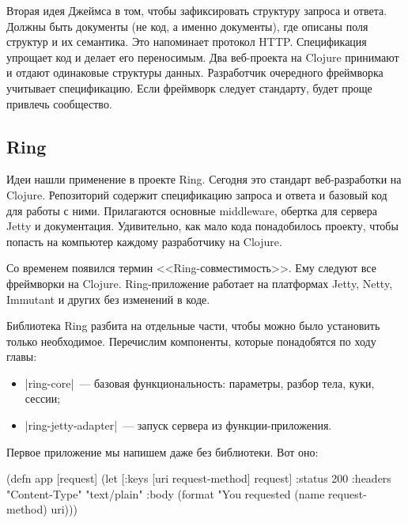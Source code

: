 Вторая идея Джеймса в том, чтобы зафиксировать структуру запроса и
ответа. Должны быть документы (не код, а именно документы), где описаны поля
структур и их семантика. Это напоминает протокол HTTP. Спецификация упрощает код
и делает его переносимым. Два веб-проекта на Clojure принимают и отдают
одинаковые структуры данных. Разработчик очередного фреймворка учитывает
спецификацию. Если фреймворк следует стандарту, будет проще привлечь сообщество.

\subsection{Ring}

\label{ring-jetty}

Идеи нашли применение в проекте
Ring. Сегодня это стандарт
веб-разработки на Clojure. Репозиторий содержит спецификацию запроса и ответа и
базовый код для работы с ними. Прилагаются основные middleware, обертка для
сервера Jetty и документация. Удивительно, как мало кода понадобилось проекту,
чтобы попасть на компьютер каждому разработчику на Clojure.

Со временем появился термин <<Ring-совместимость>>. Ему следуют все фреймворки
на Clojure. Ring-приложение работает на платформах Jetty, Netty, Immutant и
других без изменений в коде.

Библиотека Ring разбита на отдельные части, чтобы можно было установить только
необходимое. Перечислим компоненты, которые понадобятся по ходу главы:

\begin{itemize}
\item
  \spverb|ring-core|~--- базовая функциональность: параметры, разбор тела, куки,
  сессии;

\item
  \spverb|ring-jetty-adapter|~--- запуск сервера из функции-приложения.

\end{itemize}

Первое приложение мы напишем даже без библиотеки. Вот оно:

\label{first-handler}

\begin{english}
  \begin{clojure}
(defn app [request]
  (let [{:keys [uri request-method]} request]
    {:status 200
     :headers {"Content-Type" "text/plain"}
     :body (format "You requested %
                   (name request-method) uri)}))
  \end{clojure}
\end{english}

